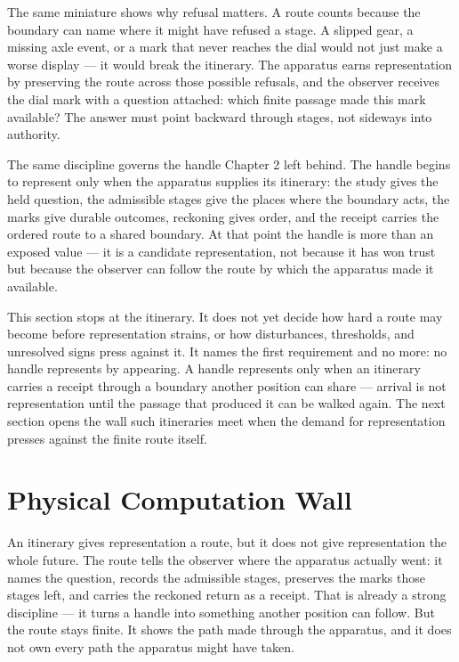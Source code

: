 The same miniature shows why refusal matters. A route counts because the boundary can name where it might have refused a stage. A slipped gear, a missing axle event, or a mark that never reaches the dial would not just make a worse display --- it would break the itinerary. The apparatus earns representation by preserving the route across those possible refusals, and the observer receives the dial mark with a question attached: which finite passage made this mark available? The answer must point backward through stages, not sideways into authority.

The same discipline governs the handle Chapter 2 left behind. The handle begins to represent only when the apparatus supplies its itinerary: the study gives the held question, the admissible stages give the places where the boundary acts, the marks give durable outcomes, reckoning gives order, and the receipt carries the ordered route to a shared boundary. At that point the handle is more than an exposed value --- it is a candidate representation, not because it has won trust but because the observer can follow the route by which the apparatus made it available.

This section stops at the itinerary. It does not yet decide how hard a route may become before representation strains, or how disturbances, thresholds, and unresolved signs press against it. It names the first requirement and no more: no handle represents by appearing. A handle represents only when an itinerary carries a receipt through a boundary another position can share --- arrival is not representation until the passage that produced it can be walked again. The next section opens the wall such itineraries meet when the demand for representation presses against the finite route itself.

\section{Physical Computation Wall}

An itinerary gives representation a route, but it does not give representation the whole future. The route tells the observer where the apparatus actually went: it names the question, records the admissible stages, preserves the marks those stages left, and carries the reckoned return as a receipt. That is already a strong discipline --- it turns a handle into something another position can follow. But the route stays finite. It shows the path made through the apparatus, and it does not own every path the apparatus might have taken.

